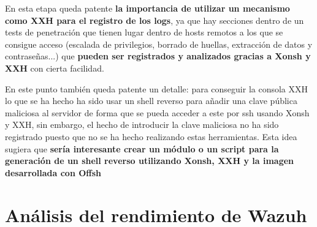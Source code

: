 En esta etapa queda patente \textbf{la importancia de utilizar un mecanismo como XXH para el registro de los logs}, ya que hay secciones dentro de un tests de penetración que tienen lugar dentro de hosts remotos a los que se consigue acceso (escalada de privilegios, borrado de huellas, extracción de datos y contraseñas...) que \textbf{pueden ser registrados y analizados gracias a Xonsh y XXH} con cierta facilidad.

En este punto también queda patente un detalle: para conseguir la consola XXH lo que se ha hecho ha sido usar un shell reverso para añadir una clave pública maliciosa al servidor de forma que se pueda acceder a este por ssh usando Xonsh y XXH, sin embargo, el hecho de introducir la clave maliciosa no ha sido registrado puesto que no se ha hecho realizando estas herramientas. Esta idea sugiera que \textbf{sería interesante crear un módulo o un script para la generación de un shell reverso utilizando Xonsh, XXH y la imagen desarrollada con Offsh}

\section{Análisis del rendimiento de Wazuh}

